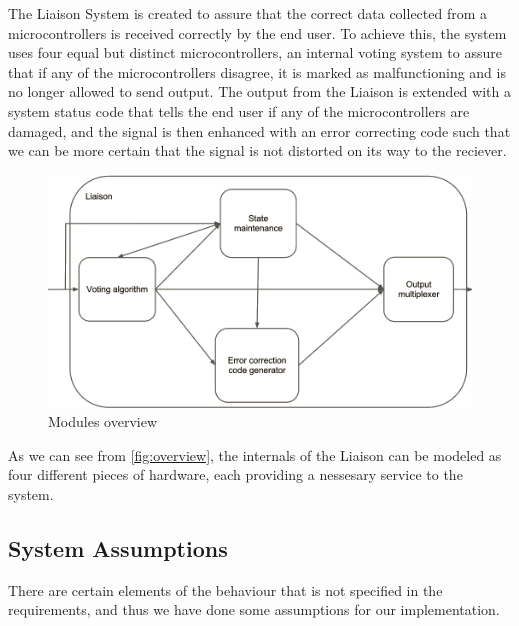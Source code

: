 The Liaison System is created to assure that the correct data collected from a microcontrollers is received correctly by the end user.
To achieve this, the system uses four equal but distinct microcontrollers, an internal voting system to assure that if any of the microcontrollers
disagree, it is marked as malfunctioning and is no longer allowed to send output. The output from the Liaison is extended with a system status
code that tells the end user if any of the microcontrollers are damaged, and the signal is then enhanced with an error correcting code such that
we can be more certain that the signal is not distorted on its way to the reciever.

\begin{figure}[h]
\includegraphics[width=15cm]{design/fig_overview}
\caption{Modules overview}
\label{fig:overview}
\end{figure}

As we can see from \autoref{fig:overview}, the internals of the Liaison can be modeled as four different pieces of hardware, each providing a
nessesary service to the system.

\subsection{System Assumptions}
There are certain elements of the behaviour that is not specified in the requirements, and thus
we have done some assumptions for our implementation.

